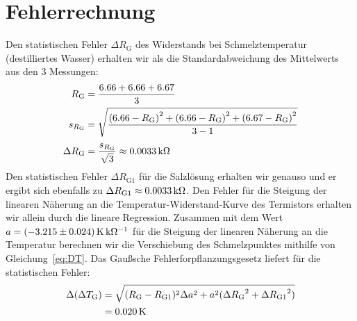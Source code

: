 \section{Fehlerrechnung}
\newcommand{\rg}{R_\mathrm{G}} %
\newcommand{\stat}{\Delta} %

Den statistischen Fehler $\Delta \rg$ des Widerstands bei Schmelztemperatur (destilliertes Wasser) erhalten wir als die Standardabweichung des Mittelwerts aus den 3 Messungen:
%
\begin{align*}
            \rg &= \frac{6.66 + 6.66 + 6.67}{3} \\
        s_{\rg} &= \sqrt{\frac{\left(6.66 - \rg\right)^2 + \left(6.66 - \rg\right)^2 + \left(6.67 - \rg\right)^2}{3 - 1}} \\[1mm]
    \stat \rg  &= \frac{s_{\rg}}{\sqrt{3}} \approx \unit[0.0033]{k\Omega}
\end{align*}
%
Den statistischen Fehler $\stat R_\mathrm{G1}$ für die Salzlösung erhalten wir genauso und er ergibt sich ebenfalls zu $\Delta R_\mathrm{G1} \approx \unit[0.0033]{k\Omega}$.
%
Den Fehler für die Steigung der linearen Näherung an die Temperatur-Widerstand-Kurve des Termistors erhalten wir allein durch die lineare Regression.
%
Zusammen mit dem Wert $a = \unit[(-3.215 \pm 0.024)]{K\, k\Omega^{-1}}$ für die Steigung der linearen Näherung an die Temperatur berechnen wir die Verschiebung des Schmelzpunktes mithilfe von Gleichung~\ref{eq:DT}. Das Gaußsche Fehlerforpflanzungsgesetz liefert für die statistischen Fehler:
%
\begin{align*}
    \stat(\Delta T_\mathrm{G}) &= \sqrt{(R_\mathrm{G} - R_\mathrm{G1})^2 \stat a^2 +
                                                      a^2 (\stat {R_\mathrm{G}}^2 + \stat {R_\mathrm{G1}}^2)} \\
                                              &= \unit[0.020]{K}
\end{align*}
%

